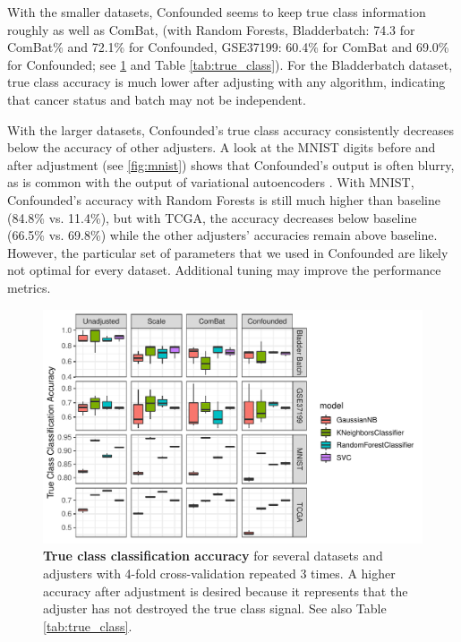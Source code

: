 \documentclass[11pt]{article}
\begin{document}
With the smaller datasets, Confounded seems to keep true class information roughly as well as ComBat, (with Random Forests, Bladderbatch: 74.3 for ComBat\% and 72.1\% for Confounded, GSE37199: 60.4\% for ComBat and 69.0\% for Confounded; see \figurename{} \ref{fig:true_class} and Table \ref{tab:true_class}).
For the Bladderbatch dataset, true class accuracy is much lower after adjusting with any algorithm, indicating that cancer status and batch may not be independent.

With the larger datasets, Confounded's true class accuracy consistently decreases below the accuracy of other adjusters.
A look at the MNIST digits before and after adjustment (see \figurename{} \ref{fig:mnist}) shows that Confounded's output is often blurry, as is common with the output of variational autoencoders \cite{hou_deep_2016}.
With MNIST, Confounded's accuracy with Random Forests is still much higher than baseline (84.8\% vs. 11.4\%), but with TCGA, the accuracy decreases below baseline (66.5\% vs. 69.8\%) while the other adjusters' accuracies remain above baseline.
However, the particular set of parameters that we used in Confounded are likely not optimal for every dataset.
Additional tuning may improve the performance metrics.

\begin{figure}
	\centering
	\includegraphics[width=\columnwidth]{figures/final/true_class_accuracy.pdf}
	\caption[True class classification accuracy]{\textbf{True class classification accuracy} for several datasets and adjusters with 4-fold cross-validation repeated 3 times. A higher accuracy after adjustment is desired because it represents that the adjuster has not destroyed the true class signal.
	See also Table \ref{tab:true_class}.}
	\label{fig:true_class}
\end{figure}
\begin{table}
	\centering
	
	\caption[True class classification accuracy]{
		\textbf{True class classification accuracy} for several datasets and adjusters.
		After adjustment by the ideal batch adjuster, all true class signal should be preserved, and all classifiers should therefore have the same accuracy in predicting true class before and after adjustment.
		See also \figurename{} \ref{fig:true_class}.
	}
	\label{tab:true_class}
\end{table}
\end{document}
